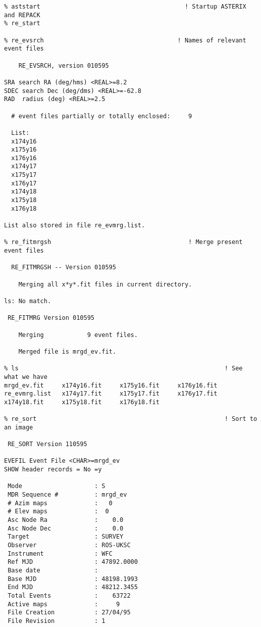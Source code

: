 \begin{small}
\begin{verbatim}
% aststart                                        ! Startup ASTERIX and REPACK
% re_start

% re_evsrch                                     ! Names of relevant event files

    RE_EVSRCH, version 010595

SRA search RA (deg/hms) <REAL>=8.2
SDEC search Dec (deg/dms) <REAL>=-62.8
RAD  radius (deg) <REAL>=2.5

  # event files partially or totally enclosed:     9

  List:
  x174y16
  x175y16
  x176y16
  x174y17
  x175y17
  x176y17
  x174y18
  x175y18
  x176y18

List also stored in file re_evmrg.list.

% re_fitmrgsh                                      ! Merge present event files

  RE_FITMRGSH -- Version 010595

    Merging all x*y*.fit files in current directory.

ls: No match.

 RE_FITMRG Version 010595

    Merging            9 event files.

    Merged file is mrgd_ev.fit.

% ls                                                         ! See what we have
mrgd_ev.fit     x174y16.fit     x175y16.fit     x176y16.fit
re_evmrg.list   x174y17.fit     x175y17.fit     x176y17.fit
x174y18.fit     x175y18.fit     x176y18.fit

% re_sort                                                    ! Sort to an image

 RE_SORT Version 110595

EVEFIL Event File <CHAR>=mrgd_ev
SHOW header records = No =y

 Mode                    : S
 MDR Sequence #          : mrgd_ev
 # Azim maps             :   0
 # Elev maps             :  0
 Asc Node Ra             :    0.0
 Asc Node Dec            :    0.0
 Target                  : SURVEY
 Observer                : ROS-UKSC
 Instrument              : WFC
 Ref MJD                 : 47892.0000
 Base date               :
 Base MJD                : 48198.1993
 End MJD                 : 48212.3455
 Total Events            :    63722
 Active maps             :     9
 File Creation           : 27/04/95
 File Revision           : 1


\end{verbatim}
\end{small}
